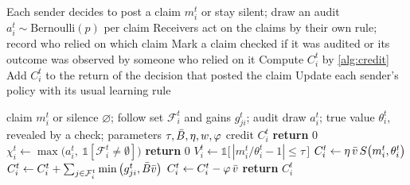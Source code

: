\begin{algorithm}[t]
  \caption{Learning with \tvc{} (per episode)}
  \label{alg:tvc}
  \begin{algorithmic}
    \STATE Each sender decides to post a claim $m_i^t$ or stay silent; draw an audit $a_i^t\sim\mathrm{Bernoulli}(p)$ per claim
    \STATE Receivers act on the claims by their own rule; record who relied on which claim
    \STATE Mark a claim checked if it was audited or its outcome was observed by someone who relied on it
      \STATE Compute $C_i^t$ by \cref{alg:credit}
      \STATE Add $C_i^t$ to the return of the decision that posted the claim
    \ENDFOR
    \STATE Update each sender's policy with its usual learning rule
  \end{algorithmic}
\end{algorithm}

\begin{algorithm}[t]
  \caption{\tvc{} credit of one sender in one round (the credit step of \cref{alg:tvc})}
  \label{alg:credit}
  \begin{algorithmic}
    \REQUIRE claim $m_i^t$ or silence $\varnothing$; follow set $\mathcal F_i^t$ and gains $g_{ji}^t$; audit draw $a_i^t$; true value $\theta_i^t$, revealed by a check; parameters $\tau,\bar B,\eta,w,\varphi$
    \ENSURE credit $C_i^t$
      \STATE \textbf{return} $0$
    \ENDIF
    \STATE $\chi_i^t\leftarrow\max\big(a_i^t,\ \mathbb 1[\mathcal F_i^t\neq\emptyset]\big)$ 
      \STATE \textbf{return} $0$ 
    \ENDIF
    \STATE $V_i^t\leftarrow\mathbb 1\big[\,|m_i^t/\theta_i^t-1|\le\tau\,\big]$ 
    \STATE $C_i^t\leftarrow\eta\,\bar v\,S\big(m_i^t,\theta_i^t\big)$ 
      \STATE $C_i^t\leftarrow C_i^t+\sum_{j\in\mathcal F_i^t}\min\big(g_{ji}^t,\bar B\bar v\big)$ 
      \STATE $C_i^t\leftarrow C_i^t-\varphi\,\bar v$ 
    \ENDIF
    \STATE \textbf{return} $C_i^t$
  \end{algorithmic}
\end{algorithm}

